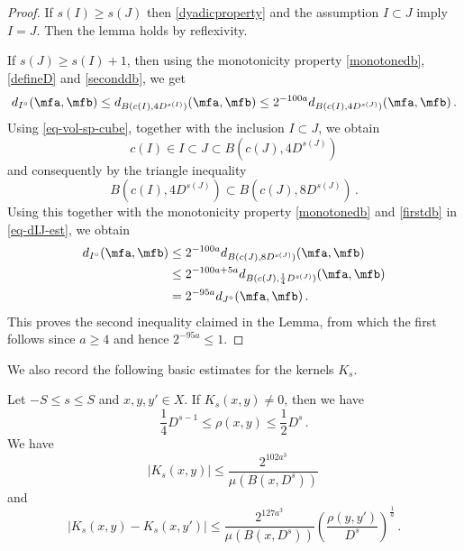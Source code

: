 \begin{proof}
    \leanok
    If $s(I) \ge s(J)$ then \eqref{dyadicproperty} and the assumption $I\subset J$ imply $I = J$. Then the lemma holds by reflexivity.

    If $s(J) \ge s(I)+1$, then using the monotonicity property \eqref{monotonedb}, \eqref{defineD} and \eqref{seconddb}, we get
    \begin{equation}
    \label{eq-dIJ-est}
        d_{I^\circ}(\mfa, \mfb) \le d_{B(c(I), 4 D^{s(I)})}(\mfa, \mfb) \le 2^{-100a} d_{B(c(I), 4D^{s(J)})}(\mfa, \mfb)\,.
    \end{equation}
    Using \eqref{eq-vol-sp-cube}, together with the inclusion $I \subset J$, we obtain
    $$
        c(I) \in I \subset J \subset B(c(J), 4 D^{s(J)})
    $$
    and consequently by the triangle inequality
    $$
        B(c(I), 4 D^{s(J)}) \subset B(c(J), 8 D^{s(J)})\,.
    $$
    Using this together with the monotonicity property \eqref{monotonedb} and \eqref{firstdb} in \eqref{eq-dIJ-est}, we obtain
    \begin{align*}
        d_{I^\circ}(\mfa, \mfb) &\le 2^{-100a} d_{B(c(J), 8D^{s(J)})}(\mfa, \mfb)\\
        &\le 2^{-100a + 5a} d_{B(c(J), \frac{1}{4}D^{s(J)})}(\mfa, \mfb)\\
        &= 2^{-95a}d_{J^\circ}(\mfa, \mfb)\,.
    \end{align*}
    This proves the second inequality claimed in the Lemma, from which the first follows since $a \ge 4$ and hence $2^{-95a} \le 1$.
\end{proof}

We also record the following basic estimates for the kernels $K_s$.

\begin{lemma}
\label{kernel-summand}
\leanok
{}
    Let $-S\le s\le S$ and $x,y,y'\in X$.
    If $K_s(x,y)\neq 0$, then we have
    \begin{equation}\label{supp-Ks}
      \frac{1}{4} D^{s-1} \leq \rho(x,y) \leq \frac{1}{2} D^s\, .
    \end{equation}
    We have
    \begin{equation}
       \label{eq-Ks-size}
        |K_s(x,y)|\le \frac{2^{102 a^3}}{\mu(B(x, D^{s}))}\,
    \end{equation}
    and
    \begin{equation}
        \label{eq-Ks-smooth}
        |K_s(x,y)-K_s(x, y')|\le \frac{2^{127a^3}}{\mu(B(x, D^{s}))}
        \left(\frac{ \rho(y,y')}{D^s}\right)^{\frac 1a}\,.
    \end{equation}
\end{lemma}

